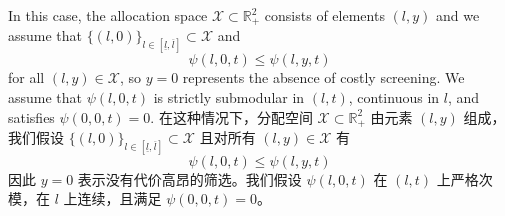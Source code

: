 \documentclass[12pt,letterpaper]{article}
\newenvironment{original}{\color{black}\noindent}{}
\newenvironment{translation}{\color{blue}\noindent}{}
\theoremstyle{plain}
\theoremstyle{definition}
\theoremstyle{remark}
\newcommand{\R}{\mathds{R}}
\renewcommand{\1}{\mathds{1}}
\newcommand{\X}{\mathcal{X}}
\theoremstyle{definition}
\begin{document}
\begin{original}
In this case, the allocation space $\mathcal{X} \subset \R^2_+$ consists of elements $(l, y)$ and we assume that $\{(l, 0)\}_{l \in [\underline{l}, \overline{l}]} \subset \mathcal{X}$ and
\[\psi(l, 0, t) \leq \psi(l, y, t)\]
for all $(l, y) \in \X$, so $y = 0$ represents the absence of costly screening. We assume that $\psi(l, 0, t)$ is strictly submodular in $(l, t)$, continuous in $l$, and satisfies $\psi(0, 0, t) = 0$.
\end{original}
\begin{translation}
在这种情况下，分配空间 $\mathcal{X} \subset \R^2_+$ 由元素 $(l, y)$ 组成，我们假设 $\{(l, 0)\}_{l \in [\underline{l}, \overline{l}]} \subset \mathcal{X}$ 且对所有 $(l, y) \in \X$ 有
\[\psi(l, 0, t) \leq \psi(l, y, t)\]
因此 $y = 0$ 表示没有代价高昂的筛选。我们假设 $\psi(l, 0, t)$ 在 $(l, t)$ 上严格次模，在 $l$ 上连续，且满足 $\psi(0, 0, t) = 0$。
\end{translation}
\end{document}
